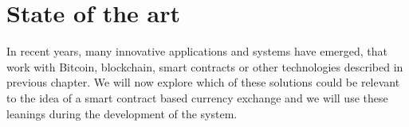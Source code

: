 \section{State of the art}
% 
In recent years, many innovative applications and systems have emerged, that work with Bitcoin, blockchain, smart contracts or other technologies described in previous chapter. We will now explore which of these solutions could be relevant to the idea of a smart contract based currency exchange and we will use these leanings during the development of the system.


% 

% 

% 

% 